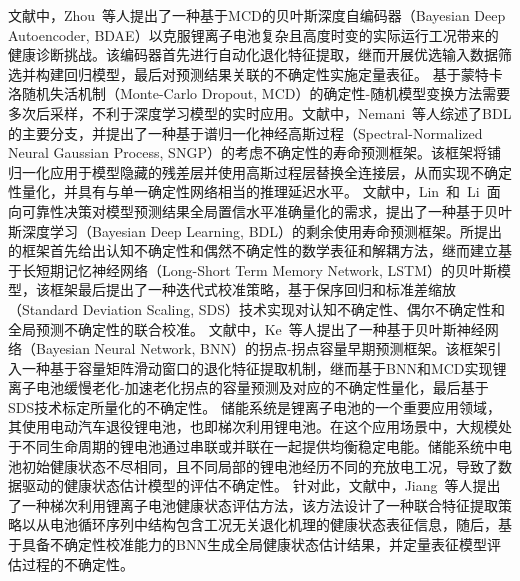 %
文献\cite{mcdropout_autoencoder_10412192}中，Zhou~等人提出了一种基于MCD的贝叶斯深度自编码器（Bayesian Deep Autoencoder, BDAE）以克服锂离子电池复杂且高度时变的实际运行工况带来的健康诊断挑战。该编码器首先进行自动化退化特征提取，继而开展优选输入数据筛选并构建回归模型，最后对预测结果关联的不确定性实施定量表征。
%
基于蒙特卡洛随机失活机制（Monte-Carlo Dropout, MCD）的确定性-随机模型变换方法需要多次后采样，不利于深度学习模型的实时应用。文献\cite{nemani2023uncertainty}中，Nemani~等人综述了BDL的主要分支，并提出了一种基于谱归一化神经高斯过程（Spectral-Normalized Neural Gaussian Process, SNGP）的考虑不确定性的寿命预测框架。该框架将铺归一化应用于模型隐藏的残差层并使用高斯过程层替换全连接层，从而实现不确定性量化，并具有与单一确定性网络相当的推理延迟水平。
%
文献\cite{9729404}中，Lin~和~Li~面向可靠性决策对模型预测结果全局置信水平准确量化的需求，提出了一种基于贝叶斯深度学习（Bayesian Deep Learning, BDL）的剩余使用寿命预测框架。所提出的框架首先给出认知不确定性和偶然不确定性的数学表征和解耦方法，继而建立基于长短期记忆神经网络（Long-Short Term Memory Network, LSTM）的贝叶斯模型，该框架最后提出了一种迭代式校准策略，基于保序回归和标准差缩放（Standard Deviation Scaling, SDS）技术实现对认知不确定性、偶尔不确定性和全局预测不确定性的联合校准。
%
文献\cite{10217044}中，Ke~等人提出了一种基于贝叶斯神经网络（Bayesian Neural Network, BNN）的拐点-拐点容量早期预测框架。该框架引入一种基于容量矩阵滑动窗口的退化特征提取机制，继而基于BNN和MCD实现锂离子电池缓慢老化-加速老化拐点的容量预测及对应的不确定性量化，最后基于SDS技术标定所量化的不确定性。
%
储能系统是锂离子电池的一个重要应用领域，其使用电动汽车退役锂电池，也即梯次利用锂电池。在这个应用场景中，大规模处于不同生命周期的锂电池通过串联或并联在一起提供均衡稳定电能。储能系统中电池初始健康状态不尽相同，且不同局部的锂电池经历不同的充放电工况，导致了数据驱动的健康状态估计模型的评估不确定性。
针对此，文献\cite{10391265}中，Jiang~等人提出了一种梯次利用锂离子电池健康状态评估方法，该方法设计了一种联合特征提取策略以从电池循环序列中结构包含工况无关退化机理的健康状态表征信息，随后，基于具备不确定性校准能力的BNN生成全局健康状态估计结果，并定量表征模型评估过程的不确定性。

